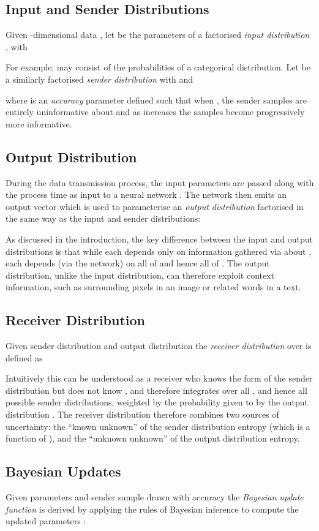 \documentclass[11pt,table]{article}
\newcommand{\0}[1]{\constvec{0}{#1}}
\newcommand{\1}[1]{\constvec{1}{#1}}
\begin{document}
\subsection{Input and Sender Distributions}
Given -dimensional data , let  be the parameters of a factorised \emph{input distribution} , with

For example,  may consist of the probabilities of a categorical distribution. 
Let  be a similarly factorised \emph{sender distribution} with  and

where  is an \emph{accuracy} parameter defined such that when , the sender samples are entirely uninformative about  and as  increases the samples become progressively more informative.
\subsection{Output Distribution \texorpdfstring{}{}}
During the data transmission process, the input parameters  are passed along with the process time  as input to a neural network .
The network then emits an output vector  which is used to parameterise an \textit{output distribution} factorised in the same way as the input and sender distributions:

As discussed in the introduction, the key difference between the input and output distributions is that while each  depends only on information gathered via  about , each  depends (via the network) on all of  and hence all of .
The output distribution, unlike the input distribution, can therefore exploit context information, such as surrounding pixels in an image or related words in a text.
\subsection{Receiver Distribution \texorpdfstring{}{}}
Given sender distribution  and output distribution  the \emph{receiver distribution} over  is defined as

Intuitively this can be understood as a receiver who knows the form of the sender distribution  but does not know , and therefore integrates over all , and hence all possible sender distributions, weighted by the probability  given to  by the output distribution .
The receiver distribution therefore combines two sources of uncertainty: the ``known unknown'' of the sender distribution entropy (which is a function of ), and the ``unknown unknown'' of the output distribution entropy.
\subsection{Bayesian Updates}
Given parameters  and sender sample  drawn with accuracy  the \emph{Bayesian update function}  is derived by applying the rules of Bayesian inference to compute the updated parameters : 
 
\end{document}
